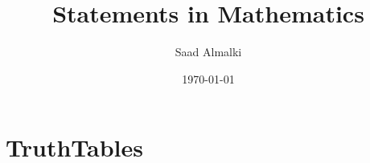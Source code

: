 \documentclass[12pt]{article}
\title{Statements in Mathematics}
\author{Saad Almalki}
\date{\today}
\begin{document}
\maketitle

\section{TruthTables}
\end{document}
